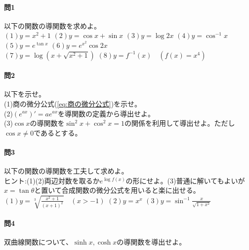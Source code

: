 \documentclass[a4j,dvipdfmx]{jsarticle}
\begin{document}
                \paragraph{問1}以下の関数の導関数を求めよ。\\
                $(1)y=x^2+1$\hspace{3mm}
                $(2)y=\cos x+\sin x$\hspace{3mm}
                $(3)y=\log 2x$\hspace{3mm}
                $(4)y=\cos^{-1}x$\hspace{3mm}
                $(5)y=e^{\tan x}$\hspace{3mm}
                $(6)y=e^{x^2}\cos 2x$\\
                $\displaystyle(7)y=\log(x+\sqrt{x^2+1})$\hspace{3mm}
                $(8)y=f^{-1}(x)\quad (f(x)=x^4)$

                \paragraph{問2}以下を示せ。\\
                (1)商の微分公式(\ref{eq:商の微分公式})を示せ。\\
                (2)$(e^{ax})'=ae^{ax}$を導関数の定義から導出せよ。\\
                (3)$\cos x$の導関数を$\sin^2 x+\cos ^2 x=1$の関係を利用して導出せよ。ただし$\cos x\neq 0$であるとする。

                \paragraph{問3}以下の関数の導関数を工夫して求めよ。\\{\scriptsize ヒント:(1)(2)両辺対数を取るか$e^{\log f(x)}$の形にせよ。(3)普通に解いてもよいが$x=\tan \theta$と置いて合成関数の微分公式を用いると楽に出せる。}\\
                $\displaystyle(1)y=\sqrt[3]{\frac{x^2+1}{(x+1)^2}}\quad(x>-1)$\hspace{3mm}
                $(2)y=x^x$\hspace{3mm}
                $\displaystyle(3)y=\sin^{-1}\frac{x}{\sqrt{1+x^2}}$

                \paragraph{問4}双曲線関数について、$\sinh x,\cosh x$の導関数を導出せよ。
\end{document}
